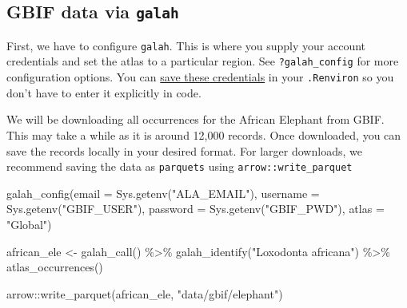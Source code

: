 \documentclass[
  letterpaper,
  DIV=11,
  numbers=noendperiod,
  oneside]{scrreprt}
\newenvironment{Shaded}{\begin{snugshade}}{\end{snugshade}}
\newcommand{\AttributeTok}[1]{\textcolor[rgb]{0.40,0.45,0.13}{#1}}
\newcommand{\FunctionTok}[1]{\textcolor[rgb]{0.28,0.35,0.67}{#1}}
\newcommand{\NormalTok}[1]{\textcolor[rgb]{0.00,0.23,0.31}{#1}}
\newcommand{\OtherTok}[1]{\textcolor[rgb]{0.00,0.23,0.31}{#1}}
\newcommand{\SpecialCharTok}[1]{\textcolor[rgb]{0.37,0.37,0.37}{#1}}
\newcommand{\StringTok}[1]{\textcolor[rgb]{0.13,0.47,0.30}{#1}}
\begin{document}
\hypertarget{gbif-data-via-galah}{%
\subsection{\texorpdfstring{GBIF data via
\texttt{galah}}{GBIF data via galah}}\label{gbif-data-via-galah}}

First, we have to configure \texttt{galah}. This is where you supply
your account credentials and set the atlas to a particular region. See
\texttt{?galah\_config} for more configuration options. You can
\href{https://docs.ropensci.org/rgbif/articles/gbif_credentials.html}{save
these credentials} in your \texttt{.Renviron} so you don't have to enter
it explicitly in code.

We will be downloading all occurrences for the African Elephant from
GBIF. This may take a while as it is around 12,000 records. Once
downloaded, you can save the records locally in your desired format. For
larger downloads, we recommend saving the data as \texttt{parquets}
using \texttt{arrow::write\_parquet}

\begin{Shaded}
\begin{Highlighting}[]
\FunctionTok{galah\_config}\NormalTok{(}\AttributeTok{email =} \FunctionTok{Sys.getenv}\NormalTok{(}\StringTok{"ALA\_EMAIL"}\NormalTok{),}
             \AttributeTok{username =} \FunctionTok{Sys.getenv}\NormalTok{(}\StringTok{"GBIF\_USER"}\NormalTok{),}
             \AttributeTok{password =} \FunctionTok{Sys.getenv}\NormalTok{(}\StringTok{"GBIF\_PWD"}\NormalTok{),}
             \AttributeTok{atlas =} \StringTok{"Global"}\NormalTok{)}

\NormalTok{african\_ele }\OtherTok{\textless{}{-}} \FunctionTok{galah\_call}\NormalTok{() }\SpecialCharTok{\%\textgreater{}\%} 
  \FunctionTok{galah\_identify}\NormalTok{(}\StringTok{"Loxodonta africana"}\NormalTok{) }\SpecialCharTok{\%\textgreater{}\%} 
  \FunctionTok{atlas\_occurrences}\NormalTok{()}

\NormalTok{arrow}\SpecialCharTok{::}\FunctionTok{write\_parquet}\NormalTok{(african\_ele, }\StringTok{"data/gbif/elephant"}\NormalTok{)}
\end{Highlighting}
\end{Shaded}
\end{document}
